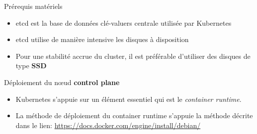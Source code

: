 
\begin{frame}[fragile]{Prérequis matériels}

   \begin{itemize}
      \item etcd est la base de données clé-valuers centrale utilisée par Kubernetes
      \item etcd utilise de manière intensive les disques à disposition
      \item Pour une stabilité accrue du cluster, il est préférable d'utiliser des disques de type \textbf{SSD}
   \end{itemize}

\end{frame}


\begin{frame}[fragile]{Déploiement du n{\oe}ud \textbf{control plane}}

   \begin{itemize}
      \item Kubernetes s'appuie sur un élément essentiel qui est le \textit{container runtime}.
      \item La méthode de déploiement du container runtime s'appuie la méthode décrite dans le lien: \url{https://docs.docker.com/engine/install/debian/}
   \end{itemize}

\end{frame}


